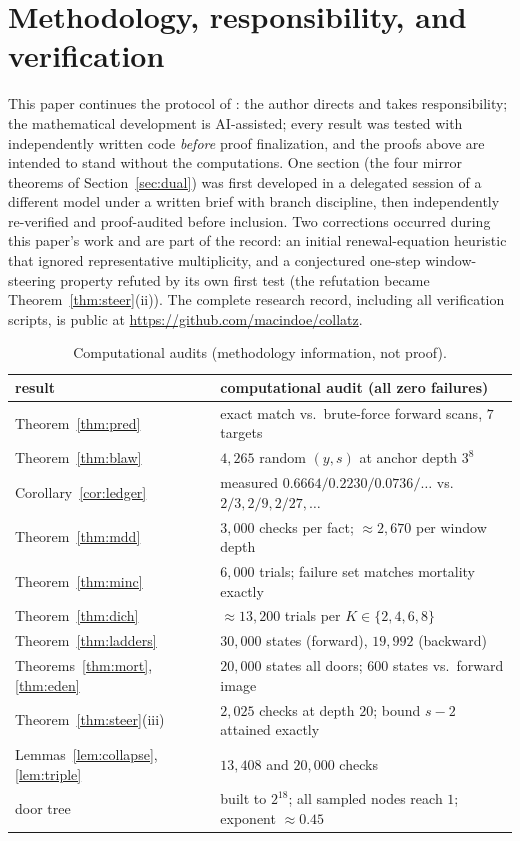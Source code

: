 \documentclass[11pt]{article}
\theoremstyle{remark}
\begin{document}
\section{Methodology, responsibility, and verification}\label{app:method}
This paper continues the protocol of \cite[App.~A]{paper1}: the author directs and takes responsibility; the mathematical development is AI-assisted; every result was tested with independently written code \emph{before} proof finalization, and the proofs above are intended to stand without the computations. One section (the four mirror theorems of Section~\ref{sec:dual}) was first developed in a delegated session of a different model under a written brief with branch discipline, then independently re-verified and proof-audited before inclusion. Two corrections occurred during this paper's work and are part of the record: an initial renewal-equation heuristic that ignored representative multiplicity, and a conjectured one-step window-steering property refuted by its own first test (the refutation became Theorem~\ref{thm:steer}(ii)). The complete research record, including all verification scripts, is public at \url{https://github.com/macindoe/collatz}.

\begin{table}[h]\centering\small
\begin{tabular}{l|l}
result & computational audit (all zero failures) \\\hline
Theorem~\ref{thm:pred} & exact match vs.\ brute-force forward scans, $7$ targets \\
Theorem~\ref{thm:blaw} & $4{,}265$ random $(y,s)$ at anchor depth $3^8$ \\
Corollary~\ref{cor:ledger} & measured $0.6664/0.2230/0.0736/\ldots$ vs.\ $2/3, 2/9, 2/27,\ldots$ \\
Theorem~\ref{thm:mdd} & $3{,}000$ checks per fact; $\approx2{,}670$ per window depth \\
Theorem~\ref{thm:minc} & $6{,}000$ trials; failure set matches mortality exactly \\
Theorem~\ref{thm:dich} & $\approx13{,}200$ trials per $K \in \{2,4,6,8\}$ \\
Theorem~\ref{thm:ladders} & $30{,}000$ states (forward), $19{,}992$ (backward) \\
Theorems~\ref{thm:mort}, \ref{thm:eden} & $20{,}000$ states all doors; $600$ states vs.\ forward image \\
Theorem~\ref{thm:steer}(iii) & $2{,}025$ checks at depth $20$; bound $s-2$ attained exactly \\
Lemmas~\ref{lem:collapse}, \ref{lem:triple} & $13{,}408$ and $20{,}000$ checks \\
door tree & built to $2^{18}$; all sampled nodes reach $1$; exponent $\approx0.45$ \\
\end{tabular}
\caption{Computational audits (methodology information, not proof).}\label{tab:verify}
\end{table}
\end{document}
